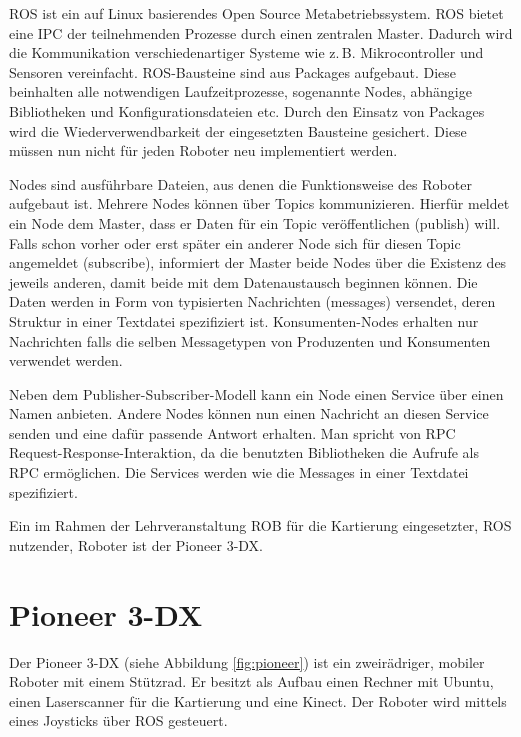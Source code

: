 \ac{ROS} ist ein auf Linux basierendes Open Source Metabetriebssystem. \ac{ROS} bietet eine \ac{IPC} der teilnehmenden Prozesse durch einen zentralen Master. Dadurch wird die Kommunikation verschiedenartiger Systeme wie z.\,B. Mikrocontroller und Sensoren vereinfacht. \ac{ROS}-Bausteine sind aus Packages aufgebaut. Diese beinhalten alle notwendigen Laufzeitprozesse, sogenannte Nodes, abhängige Bibliotheken und Konfigurationsdateien etc. Durch den Einsatz von Packages wird die Wiederverwendbarkeit der eingesetzten Bausteine gesichert. Diese müssen nun nicht für jeden Roboter neu implementiert werden. \cite{Wiki2018}\par
Nodes sind ausführbare Dateien, aus denen die Funktionsweise des Roboter aufgebaut ist. Mehrere Nodes können über Topics kommunizieren. Hierfür meldet ein Node dem Master, dass er Daten für ein Topic veröffentlichen (publish) will. Falls schon vorher oder erst später ein anderer Node sich für diesen Topic angemeldet (subscribe), informiert der Master beide Nodes über die Existenz des jeweils anderen, damit beide mit dem Datenaustausch beginnen können. Die Daten werden in Form von typisierten Nachrichten (messages) versendet, deren Struktur in einer Textdatei spezifiziert ist. Konsumenten-Nodes erhalten nur Nachrichten falls die selben Messagetypen von Produzenten und Konsumenten verwendet werden. \cite{Wiki2018}\par
Neben dem Publisher-Subscriber-Modell kann ein Node einen Service über einen Namen anbieten. Andere Nodes können nun einen Nachricht an diesen Service senden und eine dafür passende Antwort erhalten. Man spricht von \ac{RPC} Request-Response-Interaktion, da die benutzten Bibliotheken die Aufrufe als \ac{RPC} ermöglichen. Die Services werden wie die Messages in einer Textdatei spezifiziert. \cite{Wiki2018}\par
Ein im Rahmen der Lehrveranstaltung \ac{ROB} für die Kartierung ein\-ge\-setzt\-er, \ac{ROS} nutzender, Roboter ist der Pioneer 3-DX.


\section{Pioneer 3-DX} %
\label{sec:pioneer}

Der Pioneer 3-DX (siehe Abbildung \ref{fig:pioneer}) ist ein zweirädriger, mobiler Roboter mit einem Stützrad. Er besitzt als Aufbau einen Rechner mit Ubuntu, einen Laserscanner für die Kartierung und eine Kinect. Der Roboter wird mittels eines Joysticks über \ac{ROS} gesteuert.

